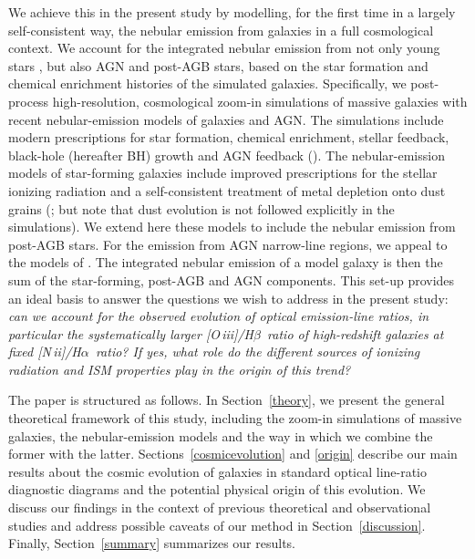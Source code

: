 \documentclass[fleqn,usenatbib]{mnras}
\newcommand{\oiiihb}{\hbox{[O\,{\sc iii}]/H$\beta$}}
\newcommand{\niiha}{\hbox{[N\,{\sc ii}]/H$\alpha$}}
\begin{document}
We achieve this in the present study by modelling, for the first 
time in a largely self-consistent way, the nebular emission from
galaxies in a full cosmological context.  We account for the
integrated nebular emission from not only young stars \citep[as
in][]{Orsi14, Shimizu16}, but also AGN and post-AGB stars, based on
the star formation and chemical enrichment histories of the simulated
galaxies. Specifically, we post-process high-resolution, cosmological
zoom-in simulations  of massive galaxies with recent nebular-emission
models of galaxies and AGN.  The simulations include modern
prescriptions for star formation, chemical enrichment, stellar
feedback, black-hole (hereafter BH) growth and AGN feedback
(\citealp{Choi16, Nunez17}). The nebular-emission models of
star-forming galaxies  include improved prescriptions for the stellar
ionizing radiation and a self-consistent  treatment of metal depletion
onto dust grains (\citealt{Gutkin16}; but note that dust evolution 
is not followed explicitly in the simulations). We
extend here  these  models to include the nebular emission from
post-AGB stars. For the emission from AGN narrow-line regions, we
appeal to the models of \citet{Feltre16}. The integrated nebular 
emission of a model galaxy is then the sum of the star-forming, post-AGB 
and AGN components. This set-up provides an ideal basis to answer 
the questions we wish to address in  the present study: {\em can we 
account for the observed
  evolution of optical emission-line ratios, in particular the
  systematically larger \oiiihb\ ratio of high-redshift galaxies at
  fixed  \niiha\ ratio? If yes, what role do the different sources of
  ionizing radiation and ISM  properties play in the origin of this
  trend?}  

The paper is structured as follows. In Section~\ref{theory}, we
present the general theoretical framework of this study, including the
zoom-in simulations of massive galaxies,  the nebular-emission models
and the way in which we combine the former with the latter.
Sections~\ref{cosmicevolution} and \ref{origin} describe our main
results about the cosmic  evolution of galaxies in standard optical
line-ratio diagnostic diagrams and the potential physical origin of
this evolution. We discuss our findings in the context of previous
theoretical and  observational studies and address possible caveats of
our method in Section~\ref{discussion}.  Finally,
Section~\ref{summary} summarizes our results.  


\end{document}
